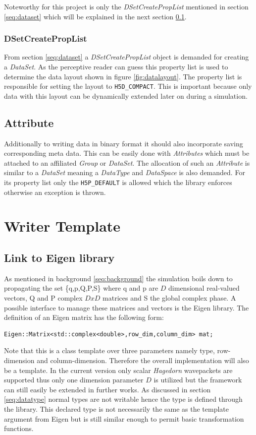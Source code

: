 Noteworthy for this project is only the \textit{DSetCreatePropList} mentioned in section \ref{seq:dataset} which will be explained in the next section \ref{seq:dscpl}.

\subsection{DSetCreatePropList}
\label{seq:dscpl}
From section \ref{seq:dataset} a \textit{DSetCreatePropList} object is demanded for creating a \textit{DataSet}. As the perceptive reader can guess this property list is used to determine the data layout shown in figure \ref{fig:datalayout}. The property list is responsible for setting the layout to \texttt{H5D\_COMPACT}. This is important because only data with this layout can be dynamically extended later on during a simulation. 

\section{Attribute}
Additionally to writing data in binary format it should also incorporate saving corresponding meta data. This can be easily done with \textit{Attributes} which must be attached to an affiliated \textit{Group} or \textit{DataSet}. The allocation of such an \textit{Attribute} is similar to a \textit{DataSet} meaning a \textit{DataType} and \textit{DataSpace} is also demanded. For its property list only the \texttt{H5P\_DEFAULT} is allowed which the library enforces otherwise an exception is thrown.

\chapter{Writer Template}
\section{Link to Eigen library}
As mentioned in background \ref{seq:background} the simulation boils down to propagating the set \{q,p,Q,P,S\} where q and p are $D$ dimensional real-valued vectors, Q and P complex $DxD$ matrices and S the global complex phase. A possible interface to manage these matrices and vectors is the Eigen library. The definition of an Eigen matrix has the following form:
\begin{lstlisting}
Eigen::Matrix<std::complex<double>,row_dim,column_dim> mat;
\end{lstlisting}
Note that this is a class template over three parameters namely type, row-dimension and column-dimension. Therefore the overall implementation will also be a template. In the current version only scalar \textit{Hagedorn} wavepackets are supported thus only one dimension parameter $D$ is utilized but the framework can still easily be extended in further works. As discussed in section \ref{seq:datatype} normal types are not writable hence the type is defined through the library. This declared type is not necessarily the same as the template argument from Eigen but is still similar enough to permit basic transformation functions.

